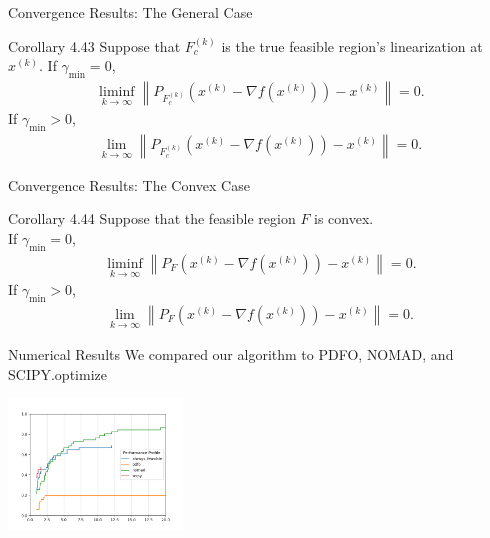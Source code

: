 \documentclass{beamer}
\newcommand{\xk}{{{x}^{(k)}}}
\begin{document}
\begin{frame}{Convergence Results: The General Case}
\begin{block}{Corollary 4.43}
Suppose that $F_c^{(k)}$ is the true feasible region's linearization at $\xk$.
If $\gamma_{\textrm{min}} = 0$,
\begin{align*}
\liminf_{k\to\infty} \left\|P_{F_c^{(k)}}\left(\xk - \nabla f\left(\xk\right)\right) - \xk\right\| = 0.
\end{align*}
If $\gamma_{\textrm{min}} > 0$,
\begin{align*}
\lim_{k\to\infty} \left\|P_{F_c^{(k)}}\left(\xk - \nabla f\left(\xk\right)\right) - \xk\right\| = 0.
\end{align*}
\end{block}
\end{frame}

\begin{frame}{Convergence Results: The Convex Case}
\begin{block}{Corollary 4.44}
Suppose that the feasible region $F$ is convex. \\
If $\gamma_{\textrm{min}} = 0$,
\begin{align*}
\liminf_{k\to\infty} \left\|P_F\left(\xk - \nabla f\left(\xk\right)\right) - \xk\right\| = 0.
\end{align*}
If $\gamma_{\textrm{min}} > 0$,
\begin{align*}
\lim_{k\to\infty} \left\|P_F\left(\xk - \nabla f\left(\xk\right)\right) - \xk\right\| = 0.
\end{align*}
\end{block}
\end{frame}


\begin{frame}{Numerical Results}
	We compared our algorithm to PDFO, NOMAD, and SCIPY.optimize
	\begin{center}
		\includegraphics[width=175px]{images/nonlinear_performance_profile.png}
	\end{center}
\end{frame}


\end{document}
